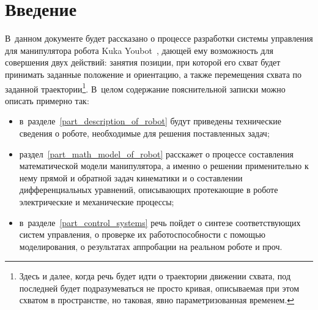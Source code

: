 \section*{Введение}
В~данном документе будет рассказано о процессе разработки системы управления для манипулятора робота Kuka Youbot~\cite{technomatix_kuka_youbot}, дающей ему возможность для совершения двух действий: занятия позиции, при которой его схват будет принимать заданные положение и ориентацию, а также перемещения схвата по заданной траектории\footnote{Здесь и далее, когда речь будет идти о траектории движении схвата, под последней будет подразумеваться не просто кривая, описываемая при этом схватом в пространстве, но таковая, явно параметризованная временем.}.
В~целом содержание пояснительной записки можно описать примерно так:
\begin{itemize}
\item в~разделе~\ref{part_description_of_robot} будут приведены технические сведения о роботе, необходимые для решения поставленных задач;
\item раздел~\ref{part_math_model_of_robot} расскажет о процессе составления математической модели манипулятора, а именно о решении применительно к нему прямой и обратной задач кинематики и о составлении дифференциальных уравнений, описывающих протекающие в роботе электрические и механические процессы;
\item в~разделе~\ref{part_control_systems} речь пойдет о синтезе соответствующих систем управления, о проверке их работоспособности с помощью моделирования, о результатах аппробации на реальном роботе и проч.
\end{itemize}
\newpage
